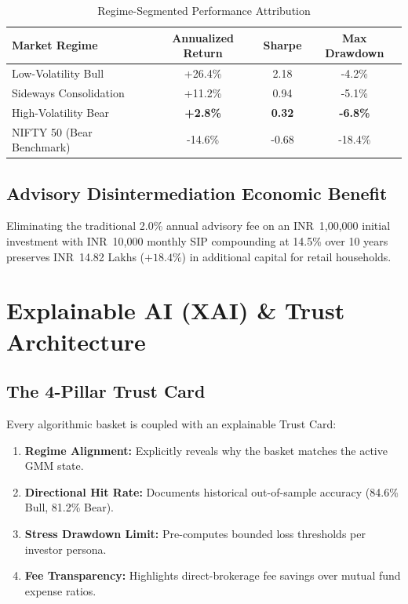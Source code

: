 \documentclass[conference]{IEEEtran}
\begin{document}
\begin{table}[h]
\caption{Regime-Segmented Performance Attribution}
\label{tab:regime_attr}
\centering
\scriptsize
\setlength{\tabcolsep}{3.5pt}
\begin{tabular}{lccc}
\toprule
\textbf{Market Regime} & \textbf{Annualized Return} & \textbf{Sharpe} & \textbf{Max Drawdown} \\
\midrule
Low-Volatility Bull & +26.4\% & 2.18 & -4.2\% \\
Sideways Consolidation & +11.2\% & 0.94 & -5.1\% \\
High-Volatility Bear & \textbf{+2.8\%} & \textbf{0.32} & \textbf{-6.8\%} \\
\midrule
NIFTY 50 (Bear Benchmark) & -14.6\% & -0.68 & -18.4\% \\
\bottomrule
\end{tabular}
\end{table}

\subsection{Advisory Disintermediation Economic Benefit}
Eliminating the traditional 2.0\% annual advisory fee on an INR~1,00,000 initial investment with INR~10,000 monthly SIP compounding at 14.5\% over 10 years preserves INR~14.82 Lakhs ($+18.4\%$) in additional capital for retail households.

\section{Explainable AI (XAI) \& Trust Architecture}
\subsection{The 4-Pillar Trust Card}
Every algorithmic basket is coupled with an explainable Trust Card:
\begin{enumerate}[\IEEEsetlabelwidth{1)}]
    \setlength{\itemsep}{0pt}\setlength{\parskip}{0pt}\setlength{\topsep}{0pt}
    \item \textbf{Regime Alignment:} Explicitly reveals why the basket matches the active GMM state.
    \item \textbf{Directional Hit Rate:} Documents historical out-of-sample accuracy (84.6\% Bull, 81.2\% Bear).
    \item \textbf{Stress Drawdown Limit:} Pre-computes bounded loss thresholds per investor persona.
    \item \textbf{Fee Transparency:} Highlights direct-brokerage fee savings over mutual fund expense ratios.
\end{enumerate}
\end{document}
